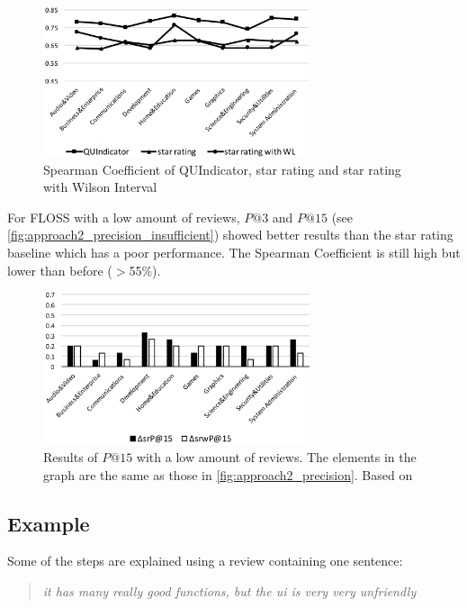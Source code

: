 \begin{figure}
    \centering
    \includegraphics[width=0.7\textwidth]{images/Thema4_Approach2_Spearman.png}
    \caption{Spearman Coefficient of QUIndicator, star rating and star rating with Wilson Interval \cite[Figure 4]{Qian2016}}
    \label{fig:approach2_spearman}
\end{figure}

For FLOSS with a low amount of reviews, $P@3$ and $P@15$ (see \autoref{fig:approach2_precision_insufficient}) showed better results than the star rating baseline which has a poor performance. The Spearman Coefficient is still high but lower than before ($>$55\%).

\begin{figure}
    \centering
    \includegraphics[width=0.7\textwidth]{images/Thema4_Approach2_Precision_Insufficient.png}
    \caption{Results of $P@15$ with a low amount of reviews. The elements in the graph are the same as those in \autoref{fig:approach2_precision}. Based on \cite[Figure 5]{Qian2016}}
    \label{fig:approach2_precision_insufficient}
\end{figure}

\subsection{Example}
Some of the steps are explained using a review containing one sentence:
\begin{quote}
    \textit{it has many really good functions, but the ui is very very unfriendly}
\end{quote}


